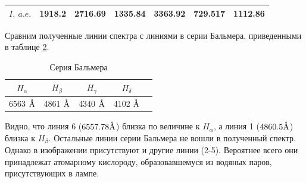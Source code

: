 \documentclass[a4paper, 12pt]{article}
\newcommand{\angstrom}{\textup{\AA}}
\begin{document}
\begin{enumerate}
\begin{table}
\begin{tabular}{|c|c|c|c|c|c|c|}
                $I,\ a.e.$ & 1918.2 & 2716.69 & 1335.84 & 3363.92 & 729.517 & 1112.86 \\
                \hline
		    \end{tabular}
		    \label{table:peaks}
		\end{table}
		Сравним полученные линии спектра с линиями в серии Бальмера, приведенными в таблице \ref{table:balmer}.
		\begin{table}[]
		    \centering
		    \caption{Серия Бальмера}
		    \begin{tabular}{|c|c|c|c|c|}
		        \hline
		        $H_{\alpha}$ & $H_{\beta}$ & $H_{\gamma}$ & $H_{\delta}$\\
		        \hline
		         6563 $\angstrom$ & 4861 $\angstrom$ & 4340 $\angstrom$ & 4102 $\angstrom$\\
		         \hline
		    \end{tabular}
		    \label{table:balmer}
		\end{table}\par
		Видно, что линия 6 ($6557.78\angstrom$) близка по величине к $H_{\alpha}$, а линия 1 ($4860.5\angstrom$) близка к $H_{\beta}$. Остальные линии серии Бальмера не вошли в полученный спектр. Однако в изображении присутствуют и другие линии (2-5). Вероятнее всего они принадлежат атомарному кислороду, образовавшемуся из водяных паров, присутствующих в лампе.
\end{enumerate}
\end{document}
